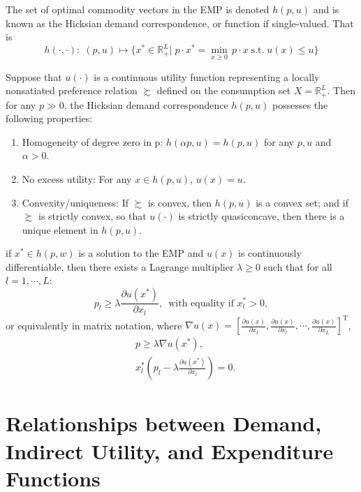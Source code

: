 \documentclass[11pt,fleqn]{book} %
\begin{document}
\begin{definition}
The set of optimal commodity vectors in the EMP is denoted $h(p, u)$ and is known as the Hicksian demand correspondence, or function if single-valued. That is
\[
h(\cdot,\cdot):\;(p,u)\mapsto \{x^*\in\mathbb{R}_+^L|\;p\cdot x^*=\min_{x\ge 0}\, p\cdot x\;\mathrm{s.t.}\; u(x)\le u\}
\]	
\end{definition}

\begin{proposition}
	 Suppose that $u(\cdot)$ is a continuous utility function representing a
	locally nonsatiated preference relation $\succsim$ defined on the consumption set $X=\mathbb{R}_+^L$.
	Then for any $p \gg 0$, the Hicksian demand correspondence $h(p, u)$ possesses the
	following properties:
	\begin{enumerate}
		\item Homogeneity of degree zero in p: $h(\alpha p, u) = h(p, u)$ for any $p, u$ and $\alpha > 0$.
		\item No excess utility: For any $x \in h(p, u)$, $u(x) = u$.
		\item Convexity/uniqueness: If $\succsim$ is convex, then $h(p, u)$ is a convex set; and if $\succsim$ is strictly convex, so that $u(\cdot)$ is strictly quasiconcave, then there is
		a unique element in $h(p, u)$.
	\end{enumerate}
\end{proposition}

\begin{theorem}
	if $x^* \in h(p,w)$ is a solution to the EMP and $u(x)$ is continuously differentiable, then there exists a
	Lagrange multiplier $\lambda\ge0$ such that for all $l = 1,\cdots, L$:
	\[
	p_l\ge\lambda\frac{\partial u(x^*)}{\partial x_l}  ,\ \;\text{with equality if } x^*_l > 0,
	\]
	or equivalently in matrix notation, where $\nabla u(x)= \left[\frac{\partial u(x)}{\partial x_l},\frac{\partial u(x)}{\partial x_l},\cdots,\frac{\partial u(x)}{\partial x_L} \right]^\mathrm{T}$,
	\begin{align*}
	& p\ge\lambda\nabla u(x^*) , \\
	&x^*_l\left(p_l-\lambda\frac{\partial u(x^*)}{\partial x_l} \right)= 0.
	\end{align*}
\end{theorem}



\section{Relationships between Demand, Indirect Utility,
	and Expenditure Functions}
\end{document}
